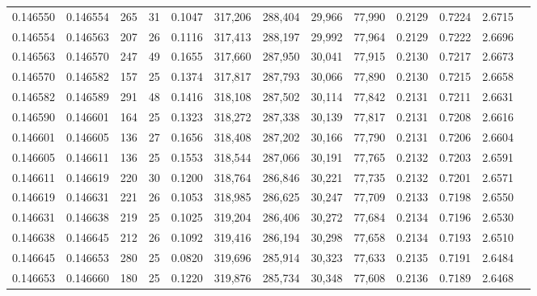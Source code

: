 \begin{tabular}{rrrrrrrrrrrrr}
0.146550 & 0.146554 & 265 &  31 &                                     0.1047 & 317,206 & 288,404 &  29,966 &  77,990 & 0.2129 & 0.7224 & 2.6715 \\
0.146554 & 0.146563 & 207 &  26 &                                     0.1116 & 317,413 & 288,197 &  29,992 &  77,964 & 0.2129 & 0.7222 & 2.6696 \\
0.146563 & 0.146570 & 247 &  49 &                                     0.1655 & 317,660 & 287,950 &  30,041 &  77,915 & 0.2130 & 0.7217 & 2.6673 \\
0.146570 & 0.146582 & 157 &  25 &                                     0.1374 & 317,817 & 287,793 &  30,066 &  77,890 & 0.2130 & 0.7215 & 2.6658 \\
0.146582 & 0.146589 & 291 &  48 &                                     0.1416 & 318,108 & 287,502 &  30,114 &  77,842 & 0.2131 & 0.7211 & 2.6631 \\
0.146590 & 0.146601 & 164 &  25 &                                     0.1323 & 318,272 & 287,338 &  30,139 &  77,817 & 0.2131 & 0.7208 & 2.6616 \\
0.146601 & 0.146605 & 136 &  27 &                                     0.1656 & 318,408 & 287,202 &  30,166 &  77,790 & 0.2131 & 0.7206 & 2.6604 \\
0.146605 & 0.146611 & 136 &  25 &                                     0.1553 & 318,544 & 287,066 &  30,191 &  77,765 & 0.2132 & 0.7203 & 2.6591 \\
0.146611 & 0.146619 & 220 &  30 &                                     0.1200 & 318,764 & 286,846 &  30,221 &  77,735 & 0.2132 & 0.7201 & 2.6571 \\
0.146619 & 0.146631 & 221 &  26 &                                     0.1053 & 318,985 & 286,625 &  30,247 &  77,709 & 0.2133 & 0.7198 & 2.6550 \\
0.146631 & 0.146638 & 219 &  25 &                                     0.1025 & 319,204 & 286,406 &  30,272 &  77,684 & 0.2134 & 0.7196 & 2.6530 \\
0.146638 & 0.146645 & 212 &  26 &                                     0.1092 & 319,416 & 286,194 &  30,298 &  77,658 & 0.2134 & 0.7193 & 2.6510 \\
0.146645 & 0.146653 & 280 &  25 &                                     0.0820 & 319,696 & 285,914 &  30,323 &  77,633 & 0.2135 & 0.7191 & 2.6484 \\
0.146653 & 0.146660 & 180 &  25 &                                     0.1220 & 319,876 & 285,734 &  30,348 &  77,608 & 0.2136 & 0.7189 & 2.6468 \\

\end{tabular}
